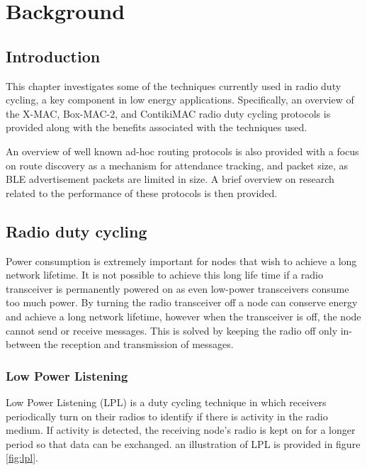 \chapter{Background} \label{background}

    \section{Introduction}
    This chapter investigates some of the techniques currently used in radio duty cycling,
    a key component in low energy applications. Specifically, an overview of the X-MAC, Box-MAC-2,
    and ContikiMAC radio duty cycling protocols is provided along with the benefits
    associated with the techniques used.

    An overview of well known ad-hoc routing protocols is also provided with a focus
    on route discovery as a mechanism for attendance tracking, and packet size,
    as BLE advertisement packets are limited in size. A brief overview on research
    related to the performance of these protocols is then provided.

    \section{Radio duty cycling}
    Power consumption is extremely important for nodes that wish to achieve a long
    network lifetime. It is not possible to achieve this long life time if a radio transceiver
    is permanently powered on as even low-power transceivers consume too much power.
    By turning the radio transceiver off a node can conserve energy and achieve a
    long network lifetime, however when the transceiver is off, the node cannot
    send or receive messages. This is solved by keeping the radio off only in-between
    the reception and transmission of messages.

      \subsection{Low Power Listening}
    Low Power Listening (LPL) \cite{LPL} is a duty cycling technique in which receivers periodically
    turn on their radios to identify if there is activity in the radio medium. If
    activity is detected, the receiving node's radio is kept on for a longer period
    so that data can be exchanged. an illustration of LPL is provided in figure \ref{fig:lpl}.

